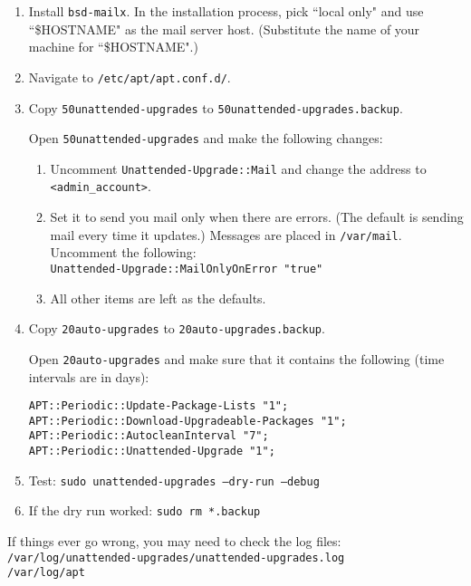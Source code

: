 \begin{enumerate}
\item Install \texttt{bsd-mailx}. In the installation process, pick ``local only" and use ``\$HOSTNAME" as the mail server host. (Substitute the name of your machine for ``\$HOSTNAME".)

\item Navigate to \texttt{/etc/apt/apt.conf.d/}.

\item Copy \texttt{50unattended-upgrades} to \texttt{50unattended-upgrades.backup}.

Open \texttt{50unattended-upgrades} and make the following changes:
	\begin{enumerate}
	\item Uncomment \texttt{Unattended-Upgrade::Mail} and change the address to \texttt{<admin\_account>}. 

	\item Set it to send you mail only when there are errors. (The default is sending mail every time it updates.) Messages are placed in \texttt{/var/mail}. Uncomment the following: \\
	\texttt{Unattended-Upgrade::MailOnlyOnError "true"}
			
	\item All other items are left as the defaults.
	\end{enumerate}

\item Copy \texttt{20auto-upgrades} to \texttt{20auto-upgrades.backup}.

	Open \texttt{20auto-upgrades} and make sure that it contains the following (time intervals are in days):
	\begin{verbatim}
APT::Periodic::Update-Package-Lists "1";
APT::Periodic::Download-Upgradeable-Packages "1";
APT::Periodic::AutocleanInterval "7";
APT::Periodic::Unattended-Upgrade "1";
	\end{verbatim}

\item Test: \texttt{sudo unattended-upgrades --dry-run --debug}

\item If the dry run worked: \texttt{sudo rm *.backup}
\end{enumerate}

\noindent If things ever go wrong, you may need to check the log files: \\
	\texttt{/var/log/unattended-upgrades/unattended-upgrades.log} \\
	\texttt{/var/log/apt}

